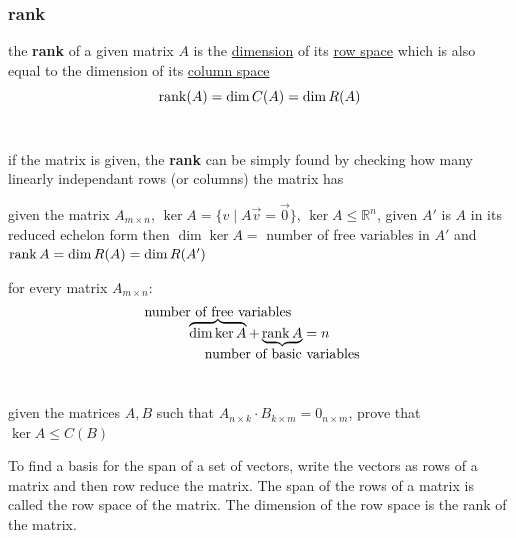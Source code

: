 \documentclass[a4paper,12pt]{article}
\begin{document}
\subsubsection{rank}
\label{sec:org33aa784}
\begin{definition}
the \textbf{rank} of a given matrix \(A\) is the \hyperref[sec:orgdef24d1]{dimension} of its \hyperref[sec:orged0dce5]{row space} which is also equal to the dimension of its \hyperref[sec:org05b7955]{column space}\\
\[
  \rank (A) = \dim C(A) = \dim R(A)
\]\\
\begin{note}
if the matrix is given, the \textbf{rank} can be simply found by checking how many linearly independant rows (or columns) the matrix has\\
\end{note}

\begin{characteristic}
given the matrix \(A_{m \times n}\), \(\ker A = \{v \mid A\vec v = \vec0\}\), \(\ker A \leq \mathbb{R}^n\), given \(A'\) is \(A\) in its reduced echelon form then \(\dim{\ker{A}} =\) number of free variables in \(A'\) and \(\rank A = \dim R(A) = \dim R(A')\)\\
\end{characteristic}

\begin{lemma}
for every matrix \(A_{m \times n}\):\\

\[
  \overbrace{\dim \ker A}^{\clap{number of free variables}} + \underbrace{\rank A}_{\clap{number of basic variables}} = n
\]\\
\end{lemma}

\begin{question}
given the matrices \(A,B\) such that \(A_{n \times k} \cdot B_{k \times m} = 0_{n \times m}\), prove that \(\ker A \leq C(B)\)\\
\end{question}

\begin{characteristic}
To find a basis for the span of a set of vectors, write the vectors as rows of a matrix and then row reduce the matrix. The span of the rows of a matrix is called the row space of the matrix. The dimension of the row space is the rank of the matrix.\\
\end{characteristic}
\end{definition}
\end{document}
